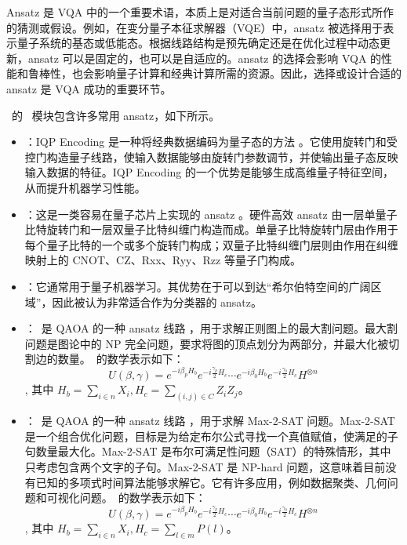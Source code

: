 Ansatz 是 VQA 中的一个重要术语，本质上是对适合当前问题的量子态形式所作的猜测或假设。例如，在变分量子本征求解器（VQE）中，ansatz 被选择用于表示量子系统的基态或低能态。根据线路结构是预先确定还是在优化过程中动态更新，ansatz 可以是固定的，也可以是自适应的。ansatz 的选择会影响 VQA 的性能和鲁棒性，也会影响量子计算和经典计算所需的资源。因此，选择或设计合适的 ansatz 是 VQA 成功的重要环节。

\MindQuantum\ 的 \nisq\ 模块包含许多常用 ansatz，如下所示。

\begin{itemize}
    \item \IQPEncoding：IQP Encoding 是一种将经典数据编码为量子态的方法 \cite{Havlíček2019}。它使用旋转门和受控门构造量子线路，使输入数据能够由旋转门参数调节，并使输出量子态反映输入数据的特征。IQP Encoding 的一个优势是能够生成高维量子特征空间，从而提升机器学习性能。

    \item \HardwareEfficientAnsatz：这是一类容易在量子芯片上实现的 ansatz \cite{Kandala2017,doi:10.1021/acs.jctc.3c00966}。硬件高效 ansatz 由一层单量子比特旋转门和一层双量子比特纠缠门构造而成。单量子比特旋转门层由作用于每个量子比特的一个或多个旋转门构成；双量子比特纠缠门层则由作用在纠缠映射上的 CNOT、CZ、Rxx、Ryy、Rzz 等量子门构成。

    \item \StronglyEntangling：它通常用于量子机器学习。其优势在于可以到达“希尔伯特空间的广阔区域”\cite{Schuld_2020}，因此被认为非常适合作为分类器的 ansatz。

    \item \MaxCutAnsatz：\MaxCutAnsatz\ 是 QAOA 的一种 ansatz 线路 \cite{farhi2014quantum}，用于求解正则图上的最大割问题。最大割问题是图论中的 NP 完全问题，要求将图的顶点划分为两部分，并最大化被切割边的数量。\MaxCutAnsatz\ 的数学表示如下：
          $$U(\beta, \gamma) = e^{-i\beta_pH_b}e^{-i\frac{\gamma_p}{2}H_c}
              \cdots e^{-i\beta_0H_b}e^{-i\frac{\gamma_0}{2}H_c}H^{\otimes n}$$,
          其中 $H_b = \sum_{i\in n}X_{i}, H_c = \sum_{(i,j)\in C}Z_iZ_j$。

    \item \MaxToSATAnsatz：\MaxToSATAnsatz\ 是 QAOA 的一种 ansatz 线路 \cite{Akshay_2020}，用于求解 Max-2-SAT 问题。Max-2-SAT 是一个组合优化问题，目标是为给定布尔公式寻找一个真值赋值，使满足的子句数量最大化。Max-2-SAT 是布尔可满足性问题（SAT）的特殊情形，其中只考虑包含两个文字的子句。Max-2-SAT 是 NP-hard 问题，这意味着目前没有已知的多项式时间算法能够求解它。它有许多应用，例如数据聚类、几何问题和可视化问题。\MaxToSATAnsatz\ 的数学表示如下：
          $$U(\beta, \gamma) = e^{-i\beta_pH_b}e^{-i\frac{\gamma_p}{2}H_c}
              \cdots e^{-i\beta_0H_b}e^{-i\frac{\gamma_0}{2}H_c}H^{\otimes n}$$,
          其中 $H_b = \sum_{i\in n}X_{i}, H_c = \sum_{l\in m}P(l)$。


\end{itemize}
